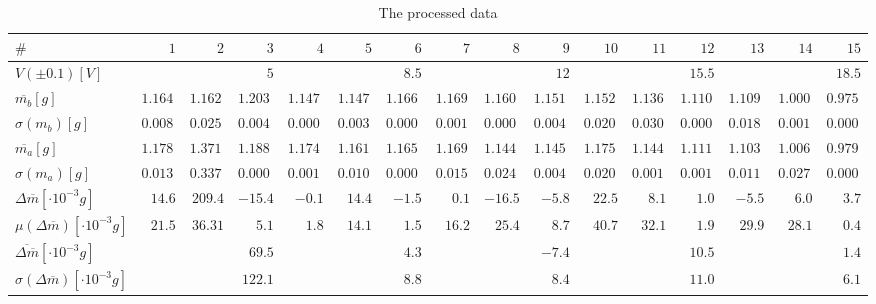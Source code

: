 \documentclass[a4paper]{article}
\begin{document}
\begin{landscape}
  \begin{table}[ht]
    \centering
    \begin{tabular}{l | r | r | r| r | r | r | r | r | r | r | r | r | r | r | r}
      $\#$ & $1$ & $2$ & $3$ & $4$ & $5$ & $6$ & $7$ & $8$ & $9$ & $10$ & $11$
      & $12$ & $13$ & $14$ & $15$ \\ \hline \hline
      $V (\pm 0.1) [\si{V}]$ & \multicolumn{3}{r|}{$5$}        &
      \multicolumn{3}{r|}{$8.5$}      & \multicolumn{3}{r|}{$12$}       &
      \multicolumn{3}{r|}{$15.5$}     & \multicolumn{3}{r}{$18.5$}     \\
      \hline
      $\overline{m_b} [\si{g}]$ & $1.1642$ & $1.1621$ & $1.2037$ & $1.1472$ &
      $1.1472$ & $1.1668$ & $1.1690$ & $1.1609$ & $1.1510$ & $1.1525$ &
      $1.1368$ & $1.1100$ & $1.1093$ & $1.0003$ & $0.9759$ \\ $\sigma (m_b)
      [\si{g}]$
      & $0.0083$ & $0.0258$ & $0.0044$ & $0.0004$ & $0.0037$ & $0.0007$ &
      $0.0010$ & $0.0009$ & $0.0043$ & $0.0202$ & $0.0303$ & $0.0009$ &
      $0.0188$ & $0.0010$ & $0.0001$ \\ $\overline{m_a} [\si{g}]$
      & $1.1788$ & $1.3715$ & $1.1883$ & $1.1749$ & $1.1616$ & $1.1653$ &
      $1.1691$ & $1.1444$ & $1.1452$ & $1.1750$ & $1.1449$ & $1.1110$ &
      $1.1038$ & $1.0063$ & $0.9796$ \\ $\sigma (m_a) [\si{g}]$
      & $0.0132$ & $0.3373$ & $0.0007$ & $0.0014$ & $0.0104$ & $0.0008$ &
      $0.0152$ & $0.0245$ & $0.0044$ & $0.0205$ & $0.0018$ & $0.0010$ &
      $0.0111$ & $0.0271$ & $0.0003$ \\ $\Delta \overline{m} [\cdot 10^{-3}
      \si{g}]$
      & $14.6$ & $209.4$  & $-15.4$  & $-0.1$   & $14.4$   & $-1.5$   & $0.1$
      & $-16.5$  & $-5.8$   & $22.5$   & $8.1$    & $1.0$    & $-5.5$   & $6.0$
      & $3.7$    \\ $\mu (\Delta \overline{m}) [\cdot 10^{-3} \si{g}]$    &
      $21.5$   &
      $36.31$  & $5.1$    & $1.8$    & $14.1$   & $1.5$    & $16.2$   & $25.4$
      & $8.7$    & $40.7$   & $32.1$   & $1.9$    & $29.9$   & $28.1$   & $0.4$
      \\ \hline $\overline{\Delta \overline{m}} [\cdot 10^{-3} \si{g}]$    &
      \multicolumn{3}{r|}{$69.5$} & \multicolumn{3}{r|}{$4.3$}      &
      \multicolumn{3}{r|}{$-7.4$}     & \multicolumn{3}{r|}{$10.5$}     &
      \multicolumn{3}{r}{$1.4$}      \\ \hline $\sigma (\Delta \overline{m}) [\cdot
      10^{-3} \si{g}]$ & \multicolumn{3}{r|}{$122.1$} & \multicolumn{3}{r|}{$8.8$}
      & \multicolumn{3}{r|}{$8.4$}      & \multicolumn{3}{r|}{$11.0$}     &
      \multicolumn{3}{r}{$6.1$}     
    \end{tabular}
    \caption{The processed data}
    \label{tab:processed}
  \end{table}
\end{landscape}
\end{document}
